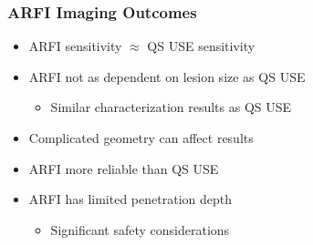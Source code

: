 \documentclass{beamer}
\begin{document}
		\begin{frame}
			\frametitle{ARFI Imaging Outcomes}
			\begin{itemize}
				\item ARFI sensitivity $\approx$ QS USE sensitivity
				\item ARFI not as dependent on lesion size as QS USE
				\begin{itemize}
					\item Similar characterization results as QS USE
				\end{itemize}
				\item Complicated geometry can affect results
				\item \alert{ARFI more reliable than QS USE}
				\item \alert{ARFI has limited penetration depth}
				\begin{itemize}
					\item Significant safety considerations
				\end{itemize}
			\end{itemize}
		\end{frame}
\end{document}
